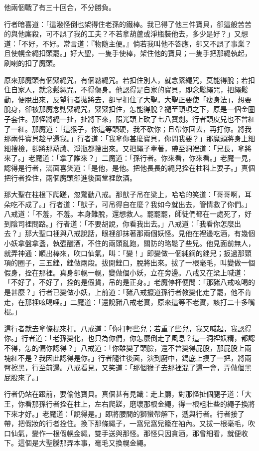 他兩個戰了有三十回合，不分勝負。

行者暗喜道：「這潑怪倒也架得住老孫的鐵棒。我已得了他三件寶貝，卻這般苦苦的與他廝殺，可不誤了我的工夫？不若拿葫蘆或淨瓶裝他去，多少是好？」又想道：「不好，不好。常言道：『物隨主便。』倘若我叫他不答應，卻又不誤了事業？且使幌金繩扣頭罷。」好大聖，一隻手使棒，架住他的寶貝；一隻手把那繩執起，刷喇的扣了魔頭。

原來那魔頭有個緊繩咒，有個鬆繩咒。若扣住別人，就念緊繩咒，莫能得脫；若扣住自家人，就念鬆繩咒，不得傷身。他認得是自家的寶貝，即念鬆繩咒，把繩鬆動，便脫出來，反望行者拋將去，卻早扣住了大聖。大聖正要使「瘦身法」，想要脫身，卻被那魔念動緊繩咒，緊緊扣住，怎能得脫？褪至頸項之下，原是一個金圈子套住。那怪將繩一扯，扯將下來，照光頭上砍了七八寶劍。行者頭皮兒也不曾紅了一紅。那魔道：「這猴子，你這等頭硬，我不砍你；且帶你回去，再打你。將我那兩件寶貝趁早還我。」行者道：「我拿你甚麼寶貝，你問我要？」那魔頭將身上細細搜檢，卻將那葫蘆、淨瓶都搜出來。又把繩子牽著，帶至洞裡道：「兄長，拿將來了。」老魔道：「拿了誰來？」二魔道：「孫行者。你來看，你來看。」老魔一見，認得是行者，滿面喜笑道：「是他，是他。把他長長的繩兒拴在柱科上耍子。」真個把行者拴住，兩個魔頭卻進後面堂裡飲酒。

那大聖在柱根下爬蹉，忽驚動八戒。那獃子吊在梁上，哈哈的笑道：「哥哥啊，耳朵吃不成了。」行者道：「獃子，可吊得自在麼？我如今就出去，管情救了你們。」八戒道：「不羞，不羞。本身難脫，還想救人。罷罷罷，師徒們都在一處死了，好到陰司裡問路。」行者道：「不要胡說，你看我出去。」八戒道：「我看你怎麼出去？」那大聖口裡與八戒說話，眼裡卻抹著那兩個妖怪。見他在裡邊吃酒，有幾個小妖拿盤拿盞，執壺釃酒，不住的兩頭亂跑，關防的略鬆了些兒。他見面前無人，就弄神通：順出棒來，吹口仙氣，叫：「變！」即變做一個純鋼的銼兒；扳過那頸項的圈子，三五銼，銼做兩段。拔開銼口，脫將出來。拔了一根毫毛，叫變做一個假身，拴在那裡。真身卻幌一幌，變做個小妖，立在旁邊。八戒又在梁上喊道：「不好了，不好了，拴的是假貨，吊的是正身。」老魔停杯便問：「那豬八戒吆喝的是甚麼？」行者已變做小妖，上前道：「豬八戒攛道孫行者教變化走了罷，他不肯走，在那裡吆喝哩。」二魔道：「還說豬八戒老實，原來這等不老實，該打二十多嘴棍。」

這行者就去拿條棍來打。八戒道：「你打輕些兒；若重了些兒，我又喊起，我認得你。」行者道：「老孫變化，也只為你們，你怎麼倒走了風息？這一洞裡妖精，都認不得，怎的偏你認得？」八戒道：「你雖變了頭臉，還不曾變得屁股，那屁股上兩塊紅不是？我因此認得是你。」行者隨往後面，演到廚中，鍋底上摸了一把，將兩臀擦黑，行至前邊。八戒看見，又笑道：「那個猴子去那裡混了這一會，弄做個黑屁股來了。」

行者仍站在跟前，要偷他寶貝。真個甚有見識：走上廳，對那怪扯個腿子道：「大王，你看那孫行者拴在柱上，左右爬蹉，磨壞那根金繩，得一根粗壯些的繩子換將下來才好。」老魔道：「說得是。」即將腰間的獅蠻帶解下，遞與行者。行者接了帶，把假妝的行者拴住。換下那條繩子，一窩兒窩兒籠在袖內。又拔一根毫毛，吹口仙氣，變作一根假幌金繩，雙手送與那怪。那怪只因貪酒，那曾細看，就便收下。這個是大聖騰那弄本事，毫毛又換幌金繩。


